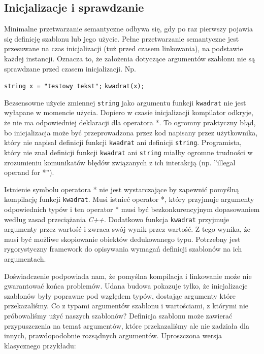 \documentclass[11pt, a4paper]{article}
\begin{document}
\lstset{language=C++}

\subsection{Inicjalizacje i sprawdzanie}

Minimalne przetwarzanie semantyczne odbywa się, gdy po raz pierwszy pojawia się definicję szablonu lub jego użycie. Pełne przetwarzanie semantyczne jest przesuwane na czas inicjalizacji (tuż przed czasem linkowania), na podstawie każdej instancji. Oznacza to, że założenia dotyczące argumentów szablonu nie są sprawdzane przed czasem inicjalizacji. Np.\newline

\noindent \verb#string x = "testowy tekst";# \newline
\verb#kwadrat(x);# \newline

Bezsensowne użycie zmiennej \verb#string# jako argumentu funkcji \verb#kwadrat# nie jest wyłapane w momencie użycia. Dopiero w czasie inicjalizacji kompilator odkryje, że nie ma odpowiedniej deklaracji dla operatora *. To ogromny praktyczny błąd, bo inicjalizacja może być przeprowadzona przez kod napisany przez użytkownika, który nie napisał definicji funkcji \verb#kwadrat# ani definicji \verb#string#. Programista, który nie znał definicji funkcji \verb#kwadrat# ani \verb#string# miałby ogromne trudności w zrozumieniu komunikatów błędów związanych z ich interakcją (np. ”illegal operand for *”).

Istnienie symbolu operatora * nie jest wystarczające by zapewnić pomyślną kompilację funkcji \verb#kwadrat#. Musi istnieć operator *, który przyjmuje argumenty odpowiednich typów i ten operator * musi być bezkonkurencyjnym dopasowaniem według zasad przeciążania \emph{C++}. Dodatkowo funkcja \verb#kwadrat# przyjmuje argumenty przez wartość i zwraca swój wynik przez wartość. Z tego wynika, że musi być możliwe skopiowanie obiektów dedukowanego typu. Potrzebny jest rygorystyczny framework do opisywania wymagań definicji szablonów na ich argumentach.

Doświadczenie podpowiada nam, że pomyślna kompilacja i linkowanie może nie gwarantować końca problemów. Udana budowa pokazuje tylko, że inicjalizacje szablonów były poprawne pod względem typów, dostając argumenty które przekazaliśmy. Co z typami argumentów szablonu i wartościami, z którymi nie próbowaliśmy użyć naszych szablonów? Definicja szablonu może zawierać przypuszczenia na temat argumentów, które przekazaliśmy ale nie zadziała dla innych, prawdopodobnie rozsądnych argumentów. Uproszczona wersja klasycznego przykładu:
\end{document}
